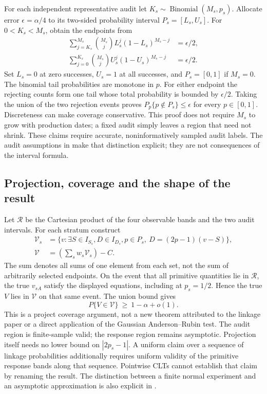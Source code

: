 For each independent representative audit let
$K_s\sim\operatorname{Binomial}(M_s,p_s)$. Allocate error
$\epsilon=\alpha/4$ to its two-sided probability interval $P_s=[L_s,U_s]$.
For $0<K_s<M_s$, obtain the endpoints from
\begin{equation}
 \begin{split}
 \sum_{j=K_s}^{M_s}\binom{M_s}{j}L_s^j(1-L_s)^{M_s-j}&=\epsilon/2,\\
 \sum_{j=0}^{K_s}\binom{M_s}{j}U_s^j(1-U_s)^{M_s-j}&=\epsilon/2.
 \end{split}
 \label{s61:binomial-inversion}
\end{equation}
Set $L_s=0$ at zero successes, $U_s=1$ at all successes, and
$P_s=[0,1]$ if $M_s=0$. The binomial tail probabilities are monotone
in $p$. For either endpoint the rejecting counts form one tail whose
total probability is bounded by $\epsilon/2$. Taking the union of the
two rejection events proves
$P_p\{p\notin P_s\}\le\epsilon$ for every $p\in[0,1]$.
Discreteness can make coverage conservative. This proof does not require
$M_s$ to grow with production dates; a fixed audit simply leaves a region
that need not shrink. These claims require accurate, noninformatively
sampled audit labels. The audit assumptions in
\citet[Section 2.1, Audit Sample]{slawski2025} make that distinction explicit;
they are not consequences of the interval formula.

\subsection{Projection, coverage and the shape of the result}
Let $\mathcal R$ be the Cartesian product of the four observable bands and
the two audit intervals. For each stratum construct
\begin{align}
 \mathcal V_s&=\{v:\exists S\in I_{S_s},D\in I_{D_s},p\in P_s,
                         \ D=(2p-1)(v-S)\},\nonumber\\
 \mathcal V&=\left(\sum_s w_s\mathcal V_s\right)-C.
 \label{s61:projection}
\end{align}
The sum denotes all sums of one element from each set, not the sum of
arbitrarily selected endpoints. On the event that all primitive quantities
lie in $\mathcal R$, the true $v_{sA}$ satisfy the displayed equations,
including at $p_s=1/2$. Hence the true $V$ lies in $\mathcal V$ on that
same event. The union bound gives
\[
 P\{V\in\mathcal V\}\ \ge\ 1-\alpha+o(1).
\]
This is a project coverage argument, not a new theorem attributed to the
linkage paper or a direct application of the Gaussian Anderson--Rubin test.
The audit region is finite-sample valid; the response region remains
asymptotic. Projection itself needs no lower bound on $|2p_s-1|$.
A uniform claim over a sequence of linkage probabilities additionally
requires uniform validity of the primitive response bands along that
sequence. Pointwise CLTs cannot establish that claim by renaming the result.
The distinction between a finite normal experiment and an asymptotic
approximation is also explicit in
\citet[Section 2.5, equations (9)--(11)]{rambachan2023}.

